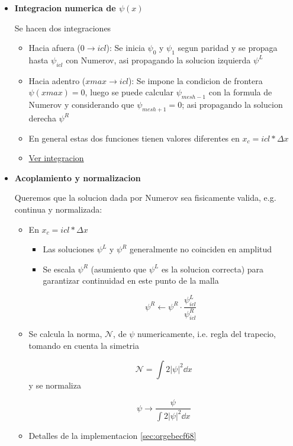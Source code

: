 \documentclass[11pt]{article}
\begin{document}
\begin{itemize}
\item \textbf{Integracion numerica de \(\psi(x)\)}

Se hacen dos integraciones

\begin{itemize}
\item Hacia afuera (\(0 \to icl\)): Se inicia \(\psi_0\) y \(\psi_1\) segun paridad y se propaga hasta \(\psi_{icl}\) con Numerov, asi propagando la solucion izquierda \(\psi^L\)

\item Hacia adentro (\(xmax \to icl\)): Se impone la condicion de frontera \(\psi(xmax) = 0\), luego se puede calcular \(\psi_{mesh -1}\) con la formula de Numerov y considerando que \(\psi_{mesh+1} = 0\); asi propagando la solucion derecha \(\psi^R\)

\item En general estas dos funciones tienen valores diferentes en \(x_c = icl * \Delta x\)

\item \hyperref[sec:org4d4f12b]{Ver integracion}
\end{itemize}

\item \textbf{Acoplamiento y normalizacion}

Queremos que la solucion dada por Numerov sea fisicamente valida, e.g. continua y normalizada:

\begin{itemize}
\item En \(x_c = icl * \Delta x\)
\begin{itemize}
\item Las soluciones \(\psi^L\) y \(\psi^R\) generalmente no coinciden en amplitud

\item Se escala \(\psi^R\) (asumiento que \(\psi^L\) es la solucion correcta) para garantizar continuidad en este punto de la malla

\[ \psi^{R} \leftarrow \psi^{R} \cdot \frac{\psi^{L}_{icl}}{\psi^{R}_{icl}} \]
\end{itemize}

\item Se calcula la norma, \(\mathcal{N}\), de \(\psi\) numericamente, i.e. regla del trapecio, tomando en cuenta la simetria

\[ \mathcal{N} = \int 2|\psi|^2 \dd{x} \]
y se normaliza

\[ \psi \to \frac{\psi}{\int 2|\psi|^2 \dd{x}} \]

\item Detalles de la implementacion \ref{sec:orgebecf68}
\end{itemize}


\end{itemize}
\end{document}
